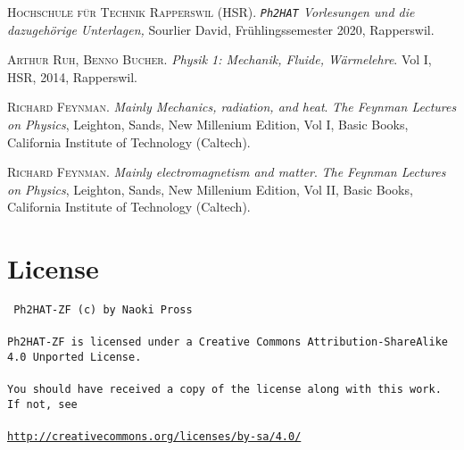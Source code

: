 \documentclass[a4paper, twocolumn]{article}
\numberwithin{equation}{section}
\theoremstyle{hsr-def}
\theoremstyle{hsr-sub}
\begin{document}
\begin{thebibliography}{2}
	\textsc{Hochschule f\"ur Technik Rapperswil (HSR)}.
    \textit{\texttt{Ph2HAT} Vorlesungen und die dazugeh\"orige Unterlagen,}
	Sourlier David,
	Fr\"uhlingssemester 2020,
	Rapperswil.

	\textsc{Arthur Ruh, Benno Bucher}.
	\textit{Physik 1: Mechanik, Fluide, W\"armelehre}.
	Vol I, HSR, 2014, Rapperswil.

	\textsc{Richard Feynman}.
	\textit{Mainly Mechanics, radiation, and heat}.
	\textit{The Feynman Lectures on Physics},
	Leighton, Sands,
	New Millenium Edition,
	Vol I,
	Basic Books,
	California Institute of Technology (Caltech).

	\textsc{Richard Feynman}.
	\textit{Mainly electromagnetism and matter}.
	\textit{The Feynman Lectures on Physics},
	Leighton, Sands,
	New Millenium Edition,
	Vol II,
	Basic Books,
	California Institute of Technology (Caltech).
	
\end{thebibliography}


\section*{License}
{ \tt
Ph2HAT-ZF (c) by Naoki Pross
\\\\
Ph2HAT-ZF is licensed under a Creative Commons Attribution-ShareAlike 4.0 Unported License.
\\\\
You should have received a copy of the license along with this work. If not, see 
\\\\
{\small\url{http://creativecommons.org/licenses/by-sa/4.0/}}
}
\end{document}
